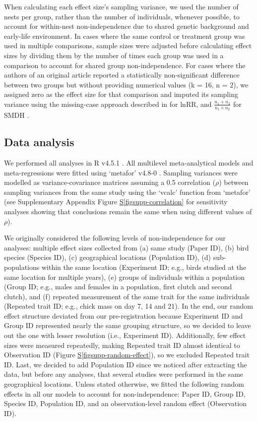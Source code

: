 \documentclass[
  number,
  review,
  onecolumn]{elsarticle}
\newcommand*\quartofigsuppref[1]{Figure \hyperref[#1]{S\ref{#1}}}
\begin{document}
When calculating each effect size's sampling variance, we used the
number of nests per group, rather than the number of individuals,
whenever possible, to account for within-nest non-independence due to
shared genetic background and early-life environment. In cases where the
same control or treatment group was used in multiple comparisons, sample
sizes were adjusted before calculating effect sizes by dividing them by
the number of times each group was used in a comparison to account for
shared group non-independence. For cases where the authors of an
original article reported a statistically non-significant difference
between two groups but without providing numerical values (k = 16, n =
2), we assigned zero as the effect size for that comparison and imputed
its sampling variance using the missing-case approach described in
\citep{nakagawa2022} for lnRR, and \(\frac{n_1+n_2}{n_1×n_2}\) for SMDH
\citep{lajeunesse2013}.

\subsection{Data analysis}\label{data-analysis}

We performed all analyses in R v4.5.1 \citep{R-version}. All multilevel
meta-analytical models and meta-regressions were fitted using `metafor'
v4.8-0 \citep{metafor}. Sampling variances were modelled as
variance-covariance matrices assuming a 0.5 correlation (\(\rho\))
between sampling variances from the same study \citep{noble2017} using
the `vcalc' function from `metafor' (see Supplementary Appendix
\quartofigsuppref{figsupp-correlation} for sensitivity analyses showing
that conclusions remain the same when using different values of
\(\rho\)).

We originally considered the following levels of non-independence for
our analyses: multiple effect sizes collected from (a) same study (Paper
ID), (b) bird species (Species ID), (c) geographical locations
(Population ID), (d) sub-populations within the same location
(Experiment ID; e.g., birds studied at the same location for multiple
years), (e) groups of individuals within a population (Group ID; e.g.,
males and females in a population, first clutch and second clutch), and
(f) repeated measurement of the same trait for the same individuals
(Repeated trait ID; e.g., chick mass on day 7, 14 and 21). In the end,
our random effect structure deviated from our pre-registration because
Experiment ID and Group ID represented nearly the same grouping
structure, so we decided to leave out the one with lesser resolution
(i.e., Experiment ID). Additionally, few effect sizes were measured
repeatedly, making Repeated trait ID almost identical to Observation ID
(\quartofigsuppref{figsupp-random-effect}), so we excluded Repeated
trait ID. Last, we decided to add Population ID since we noticed after
extracting the data, but before any analyses, that several studies were
performed in the same geographical locations. Unless stated otherwise,
we fitted the following random effects in all our models to account for
non-independence: Paper ID, Group ID, Species ID, Population ID, and an
observation-level random effect (Observation ID).
\end{document}
